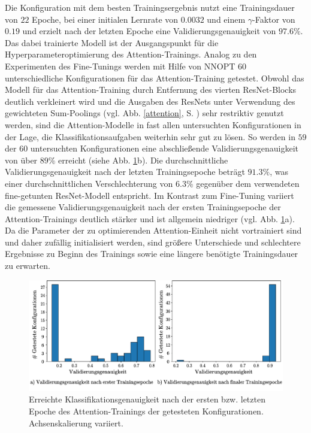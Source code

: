 \clearpage
Die Konfiguration mit dem besten Trainingsergebnis nutzt eine Trainingsdauer von $22$ Epoche, bei einer initialen Lernrate von $0.0032$ und einem $\gamma$-Faktor von $0.19$ und erzielt nach der letzten Epoche eine Validierungsgenauigkeit von $97.6\%$.
Das dabei trainierte Modell ist der Ausgangspunkt für die Hyperparameteroptimierung des Attention-Trainings. Analog zu den Experimenten des Fine-Tunings werden mit Hilfe von NNOPT $60$ unterschiedliche Konfigurationen für das Attention-Training getestet. Obwohl das Modell für das Attention-Training durch Entfernung des vierten ResNet-Blocks deutlich verkleinert wird und die Ausgaben des ResNets unter Verwendung des gewichteten Sum-Poolings (vgl. Abb. \ref{attention}, S. \pageref{attention}) sehr restriktiv genutzt werden, sind die Attention-Modelle in fast allen untersuchten Konfigurationen in der Lage, die Klassifikationsaufgaben weiterhin sehr gut zu lösen. So werden in $59$ der $60$ untersuchten Konfigurationen eine abschließende Validierungsgenauigkeit von über $89\%$ erreicht (siehe Abb. \ref{attention_int_end}b). Die durchschnittliche Validierungsgenauigkeit nach der letzten Trainingsepoche beträgt $91.3\%$, was einer durchschnittlichen Verschlechterung von $6.3\%$ gegenüber dem verwendeten fine-getunten ResNet-Modell entspricht. Im Kontrast zum Fine-Tuning variiert die gemessene Validierungsgenauigkeit nach der ersten Trainingsepoche der Attention-Trainings deutlich stärker und ist allgemein niedriger (vgl. Abb. \ref{attention_int_end}a). Da die Parameter der zu optimierenden Attention-Einheit nicht vortrainiert sind und daher zufällig initialisiert werden, sind größere Unterschiede und schlechtere Ergebnisse zu Beginn des Trainings sowie eine längere benötigte Trainingsdauer zu erwarten.
\begin{figure}[h]
\includegraphics[scale=0.75]{NNOPT/init_and_end_perf_attention.pdf}
\caption{Erreichte Klassifikationsgenauigkeit nach der ersten bzw. letzten Epoche des Attention-Trainings der getesteten Konfigurationen. Achsenskalierung variiert.}
\label{attention_int_end}
\end{figure}
